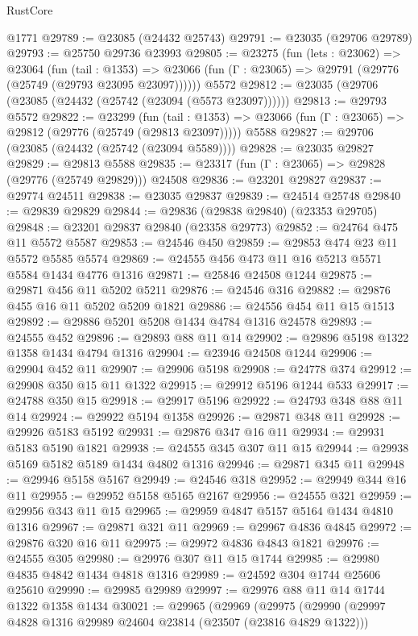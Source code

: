 \begin{lexlean}{RustCore}
\begin{coremodule}
    @1771
@29789 := @23085 (@24432 @25743)
@29791 := @23035 (@29706 @29789)
@29793 := @25750 @29736 @23993
@29805 := @23275
    (fun (lets : @23062) =>
    @23064
      (fun (tail : @1353) =>
      @23066 (fun (Γ : @23065) => @29791 (@29776 (@25749 (@29793 @23095 @23097))))))
    @5572
@29812 := @23035 (@29706 (@23085 (@24432 (@25742 (@23094 (@5573 @23097))))))
@29813 := @29793 @5572
@29822 := @23299
    (fun (tail : @1353) => @23066 (fun (Γ : @23065) => @29812 (@29776 (@25749 (@29813 @23097)))))
    @5588
@29827 := @29706 (@23085 (@24432 (@25742 (@23094 @5589))))
@29828 := @23035 @29827
@29829 := @29813 @5588
@29835 := @23317 (fun (Γ : @23065) => @29828 (@29776 (@25749 @29829))) @24508
@29836 := @23201 @29827
@29837 := @29774 @24511
@29838 := @23035 @29837
@29839 := @24514 @25748
@29840 := @29839 @29829
@29844 := @29836 (@29838 @29840) (@23353 @29705)
@29848 := @23201 @29837 @29840 (@23358 @29773)
@29852 := @24764 @475 @11 @5572 @5587
@29853 := @24546 @450
@29859 := @29853 @474 @23 @11 @5572 @5585 @5574
@29869 := @24555 @456 @473 @11 @16 @5213 @5571 @5584 @1434 @4776 @1316
@29871 := @25846 @24508 @1244
@29875 := @29871 @456 @11 @5202 @5211
@29876 := @24546 @316
@29882 := @29876 @455 @16 @11 @5202 @5209 @1821
@29886 := @24556 @454 @11 @15 @1513
@29892 := @29886 @5201 @5208 @1434 @4784 @1316 @24578
@29893 := @24555 @452
@29896 := @29893 @88 @11 @14
@29902 := @29896 @5198 @1322 @1358 @1434 @4794 @1316
@29904 := @23946 @24508 @1244
@29906 := @29904 @452 @11
@29907 := @29906 @5198
@29908 := @24778 @374
@29912 := @29908 @350 @15 @11 @1322
@29915 := @29912 @5196 @1244 @533
@29917 := @24788 @350 @15
@29918 := @29917 @5196
@29922 := @24793 @348 @88 @11 @14
@29924 := @29922 @5194 @1358
@29926 := @29871 @348 @11
@29928 := @29926 @5183 @5192
@29931 := @29876 @347 @16 @11
@29934 := @29931 @5183 @5190 @1821
@29938 := @24555 @345 @307 @11 @15
@29944 := @29938 @5169 @5182 @5189 @1434 @4802 @1316
@29946 := @29871 @345 @11
@29948 := @29946 @5158 @5167
@29949 := @24546 @318
@29952 := @29949 @344 @16 @11
@29955 := @29952 @5158 @5165 @2167
@29956 := @24555 @321
@29959 := @29956 @343 @11 @15
@29965 := @29959 @4847 @5157 @5164 @1434 @4810 @1316
@29967 := @29871 @321 @11
@29969 := @29967 @4836 @4845
@29972 := @29876 @320 @16 @11
@29975 := @29972 @4836 @4843 @1821
@29976 := @24555 @305
@29980 := @29976 @307 @11 @15 @1744
@29985 := @29980 @4835 @4842 @1434 @4818 @1316
@29989 := @24592 @304 @1744 @25606 @25610
@29990 := @29985 @29989
@29997 := @29976 @88 @11 @14 @1744 @1322 @1358 @1434
@30021 := @29965
    (@29969
      (@29975
        (@29990
          (@29997 @4828 @1316 @29989 @24604 @23814 (@23507 (@23816 @4829 @1322)))

\end{coremodule}
\end{lexlean}
